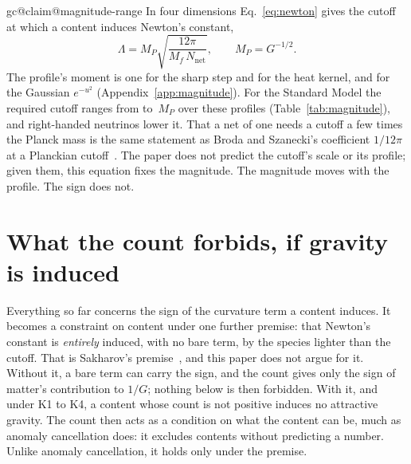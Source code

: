 \documentclass[aps,prd,reprint,amsmath,amssymb,superscriptaddress,nofootinbib]{revtex4-2}
\makeatletter
\newcommand{\Nnet}{N_{\mathrm{net}}}
\newcommand{\claim}[1]{\expandafter\xdef\csname igc@claim@#1\endcsname{\thesection}}
\makeatother
\begin{document}
\claim{magnitude-range}%
In four dimensions Eq.~\eqref{eq:newton} gives the cutoff at which a content induces
Newton's constant,
\begin{equation}
\Lambda=M_P\sqrt{\frac{12\pi}{M_f\,\Nnet}} ,\qquad M_P=G^{-1/2}.
\end{equation}
The profile's moment is one for the sharp step and for the heat kernel, and
\momentGaussian{} for the Gaussian $e^{-u^2}$ (Appendix~\ref{app:magnitude}). For the
Standard Model the required cutoff ranges from \smCutoffLow{} to
\smCutoffHigh{}\,$M_P$ over these profiles (Table~\ref{tab:magnitude}), and
right-handed neutrinos lower it. That a net of one needs a cutoff a few times the
Planck mass is the same statement as Broda and Szanecki's coefficient $1/12\pi$ at a
Planckian cutoff~\cite{BrodaSzanecki2009}. The paper does not predict the cutoff's
scale or its profile; given them, this equation fixes the magnitude. The magnitude
moves with the profile. The sign does not.

\begin{table}
\caption{The profile's moment $M_f$ and the cutoff in Planck units, by profile and
number of right-handed neutrinos $\nu_R$. The heat kernel's row rests on the proved
expansion, the Gaussian's on the imported one for Schwartz profiles; the sharp step's
moment is exact, but its expansion beyond the leading term holds only as a Ces\`aro
mean (Appendix~\ref{app:magnitude}).}
\label{tab:magnitude}
\centering

\end{table}

\section{What the count forbids, if gravity is induced}
\label{sec:forbids}

Everything so far concerns the sign of the curvature term a content induces. It becomes
a constraint on content under one further premise: that Newton's constant is
\emph{entirely} induced, with no bare term, by the species lighter than the cutoff. That
is Sakharov's premise~\cite{Sakharov1967}, and this paper does not argue for it. Without
it, a bare term can carry the sign, and the count gives only the sign of matter's
contribution to $1/G$; nothing below is then forbidden. With it, and under K1 to K4, a
content whose count is not positive induces no attractive gravity. The count then acts
as a condition on what the content can be, much as anomaly cancellation does: it
excludes contents without predicting a number. Unlike anomaly cancellation, it holds
only under the premise.
\end{document}
